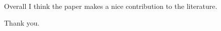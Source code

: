 \begin{revcomment}
Overall I think the paper makes a nice contribution to the literature.
\end{revcomment}


\begin{revresponse}
Thank you.
\end{revresponse}
